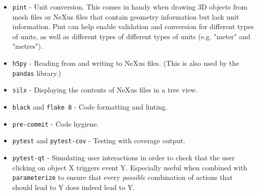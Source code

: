 \begin{itemize}
\item \texttt{pint} - Unit conversion. This comes in handy when drawing 3D objects from mesh files or NeXus files that contain geometry information but lack unit information. Pint can help enable validation and conversion for different types of units, as well as different types of different types of units (e.g. "meter" and "metres").
\item \texttt{h5py} - Reading from and writing to NeXus files. (This is also used by the \texttt{pandas} library.)
\item \texttt{silx} - Displaying the contents of NeXus files in a tree view.
\end{itemize}
\begin{itemize}
\item \texttt{black} and \texttt{flake 8} - Code formatting and linting.
\item \texttt{pre-commit} - Code hygiene.
\item \texttt{pytest} and \texttt{pytest-cov} - Testing with coverage output.
\item \texttt{pytest-qt} - Simulating user interactions in order to check that the user clicking on object X triggers event Y. Especially useful when combined with \texttt{parameterize} to ensure that every \textit{possible} combination of actions that should lead to Y does indeed lead to Y.
\end{itemize}
